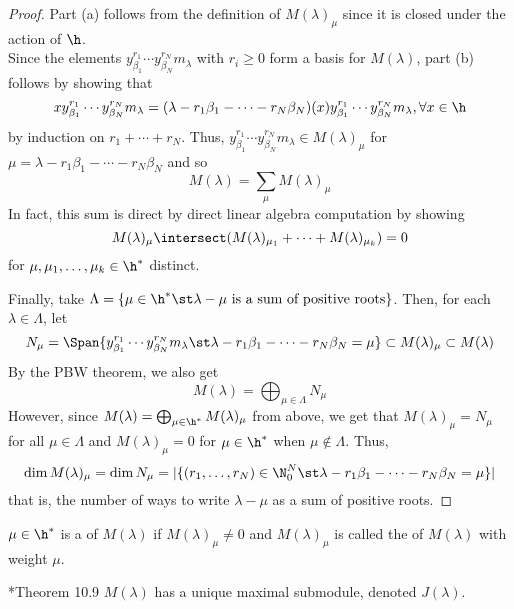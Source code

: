 \documentclass[11pt,leqno,oneside]{amsart}
\numberwithin{thm}{section}
\begin{document}
\begin{proof}
  Part (a) follows from the definition of \(M(\lambda)_\mu\) since it
  is closed under the action of \(\h\). \\

  Since the elements \(y_{\beta_1}^{r_1} \cdots y_{\beta_N}^{r_N} m_\lambda\)
  with \(r_i \geq 0\) form a basis for \(M(\lambda)\), part (b)
  follows by showing that \[
    x y_{\beta_1}^{r_1} \cdots y_{\beta_N}^{r_N} m_\lambda  = (\lambda-r_1 \beta_1
    - \cdots - r_N \beta_N)(x) y_{\beta_1}^{r_1} \cdots
    y_{\beta_N}^{r_N} m_\lambda, \forall x \in \h
  \]
  by induction on \(r_1+\cdots+r_N\). Thus, \(y_{\beta_1}^{r_1} \cdots
  y_{\beta_N}^{r_N} m_\lambda \in M(\lambda)_\mu\) for \(\mu = \lambda-r_1 \beta_1
  - \cdots - r_N \beta_N\) and so \[
    M(\lambda) = \sum_\mu M(\lambda)_\mu
  \]
  In fact, this sum is direct by direct linear algebra computation by
  showing \[
    M(\lambda)_\mu \intersect (M(\lambda)_{\mu_1} + \cdots +
    M(\lambda)_{\mu_k}) = 0
  \]
  for \(\mu, \mu_1, \ldots, \mu_k \in \h^*\) distinct.

  Finally, take \(\Lambda = \{\mu \in \h^* \st \lambda-\mu \text{ is a
  sum of positive roots}\}\). Then, for each \(\lambda \in \Lambda\),
  let \[
    N_\mu = \Span \{y_{\beta_1}^{r_1} \cdots y_{\beta_N}^{r_N} m_\lambda \st
    \lambda-r_1\beta_1 - \cdots - r_N \beta_N = \mu\} \subset
    M(\lambda)_\mu \subset M(\lambda)
  \]
  By the PBW theorem, we also get \[
    M(\lambda) = \bigoplus_{\mu \in \Lambda} N_\mu
  \]
  However, since \(M(\lambda) = \bigoplus_{\mu \in \h^*}
  M(\lambda)_\mu\) from above, we get that \(M(\lambda)_\mu = N_\mu\)
  for all \(\mu \in \Lambda\) and \(M(\lambda)_\mu = 0\) for \(\mu \in
  \h^*\) when \(\mu \not \in \Lambda\). Thus, \[
    \dim M(\lambda)_\mu = \dim N_\mu = |\{(r_1, \ldots, r_N) \in
    \N_0^N \st \lambda - r_1 \beta_1 - \cdots - r_N \beta_N = \mu\}|
  \]
  that is, the number of ways to write \(\lambda-\mu\) as a sum of
  positive roots.
\end{proof}
\begin{defn}
  \(\mu \in \h^*\) is a  of \(M(\lambda)\) if
  \(M(\lambda)_\mu \neq 0\) and \(M(\lambda)_\mu\) is called the
   of 
  \(M(\lambda)\) with weight \(\mu\).
\end{defn}
\begin{thm}
  \cite{carter}*{Theorem 10.9} \(M(\lambda)\) has a unique maximal
  submodule, denoted \(J(\lambda)\). 
\end{thm}
\end{document}
